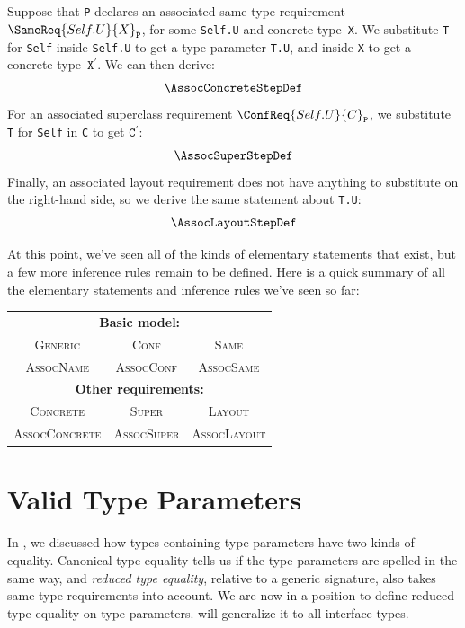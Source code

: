\documentclass[../generics]{subfiles}
\begin{document}
Suppose that \texttt{P} declares an associated same-type requirement $\SameReq{Self.U}{X}_\texttt{P}$, for some \texttt{Self.U} and concrete type~\texttt{X}. We substitute \texttt{T} for \texttt{Self} inside \texttt{Self.U} to get a type parameter \texttt{T.U}, and inside \texttt{X} to get a concrete type~$\texttt{X}^\prime$. We can then derive:
\begin{gather*}
\AssocConcreteStepDef
\end{gather*}
For an associated superclass requirement $\ConfReq{Self.U}{C}_\texttt{P}$, we substitute \texttt{T} for \texttt{Self} in \texttt{C} to get $\texttt{C}^\prime$:
\begin{gather*}
\AssocSuperStepDef
\end{gather*}
Finally, an associated layout requirement does not have anything to substitute on the right-hand side, so we derive the same statement about \texttt{T.U}:
\begin{gather*}
\AssocLayoutStepDef
\end{gather*}

\pagebreak

At this point, we've seen all of the kinds of elementary statements that exist, but a few more inference rules remain to be defined. Here is a quick summary of all the elementary statements and inference rules we've seen so far:
\begin{center}
\begin{tabular}{ccc}
\toprule
\multicolumn{3}{c}{\textbf{Basic model:}}\\
\textsc{Generic}&\textsc{Conf}&\textsc{Same}\\
\textsc{AssocName}&\textsc{AssocConf}&\textsc{AssocSame}\\
\midrule
\multicolumn{3}{c}{\textbf{Other requirements:}}\\
\textsc{Concrete}&\textsc{Super}&\textsc{Layout}\\
\textsc{AssocConcrete}&\textsc{AssocSuper}&\textsc{AssocLayout}\\
\bottomrule
\end{tabular}
\end{center}

\section{Valid Type Parameters}\label{type params}

In , we discussed how types containing type parameters have two kinds of equality. Canonical type equality tells us if the type parameters are spelled in the same way, and \emph{reduced type equality}, relative to a generic signature, also takes same-type requirements into account. We are now in a position to define reduced type equality on type parameters.  will generalize it to all interface types.
\end{document}
